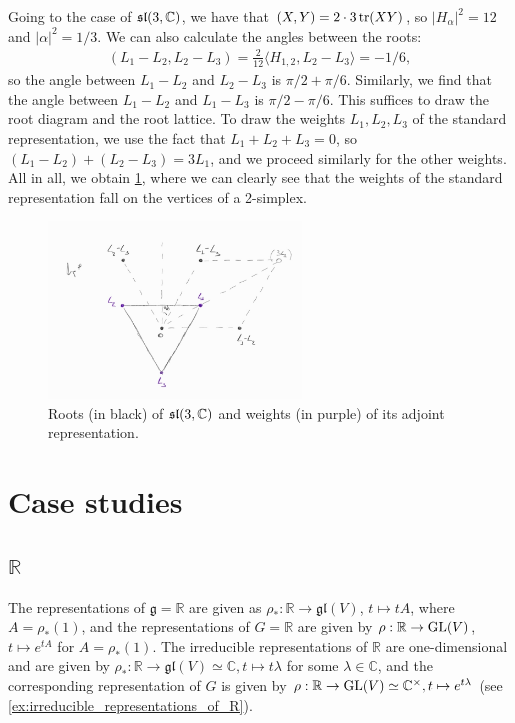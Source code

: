 \documentclass{report}
\begin{document}
Going to the case of $\operatorname{{\mathfrak{sl}}}(3, \mathbb C)$, we have that $(X, Y) = 2 \cdot 3 \operatorname{tr}(XY)$, so $|H_\alpha|^2 = 12$ and $|\alpha|^2 = 1/3$.
We can also calculate the angles between the roots:
\begin{align*}
    (L_1 - L_2, L_2 - L_3) = \frac{2}{12} \langle H_{1,2}, L_2 - L_3 \rangle = -1/6,
\end{align*}
so the angle between $L_1 - L_2$ and $L_2 - L_3$ is $\pi/2 + \pi/6$.
Similarly, we find that the angle between $L_1 - L_2$ and $L_1 - L_3$ is $\pi/2 - \pi/6$.
This suffices to draw the root diagram and the root lattice.
To draw the weights $L_1, L_2, L_3$ of the standard representation, we use the fact that $L_1 + L_2 + L_3 = 0$, so $(L_1 - L_2) + (L_2 - L_3) = 3 L_1$, and we proceed similarly for the other weights.
All in all, we obtain \cref{fig:roots_and_weights_for_standard_sl_3_C}, where we can clearly see that the weights of the standard representation fall on the vertices of a 2-simplex.
\begin{figure}[h]\label{fig:roots_and_weights_for_standard_sl_3_C}
    \centering
    \includegraphics[width=0.6\textwidth]{roots_and_weights_for_standard_sl_3_C.jpg}
    \caption{Roots (in black) of $\operatorname{{\mathfrak{sl}}}(3,\mathbb C)$ and weights (in purple) of its adjoint representation.}
\end{figure}


\chapter{Case studies}
\section{$\mathbb R$}
The representations of $\mathfrak g = \mathbb R$ are given as $\rho_*: \mathbb R \to \mathfrak{gl}(V)$, $t \mapsto t A$, where $A = \rho_*(1)$, and the representations of $G = \mathbb R$ are given by $\rho: \mathbb R \to \operatorname{{\mathrm{GL}}}(V)$, $t \mapsto e^{tA}$ for $A = \rho_*(1)$.
The irreducible representations of $\mathbb R$ are one-dimensional and are given by $\rho_*: \mathbb R \to \mathfrak{gl}(V) \simeq \mathbb C, t \mapsto t \lambda$ for some $\lambda \in \mathbb C$, and the corresponding representation of $G$ is given by $\rho: \mathbb R \to \operatorname{{\mathrm{GL}}}(V) \simeq \mathbb C^{\times}, t \mapsto e^{t \lambda}$ (see \cref{ex:irreducible_representations_of_R}).
\end{document}
